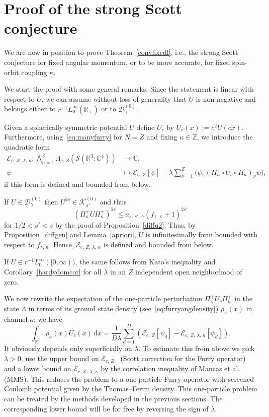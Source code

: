 \documentclass[AHL,Unicode,longabstracts,published]{cedram}
\newcommand*\dx{\mathrm{d}x}
\newcommand*\cz{\mathbb{C}}
\newcommand*\gz{\mathbb{Z}}
\newcommand*\rz{\mathbb{R}}
\newcommand*\zp{\dot{\gz}}
\newcommand*\cD{\mathcal{D}}
\newcommand*\cE{\mathcal{E}}
\newcommand*\cK{\mathcal{K}}
\newcommand*\cS{\mathcal{S}}
\begin{document}
\section{Proof of the strong Scott conjecture}
We are now in position to prove Theorem~\ref{convfixedl}, i.e., the strong Scott conjecture for fixed angular momentum, or to be more accurate, for fixed spin-orbit coupling $\kappa$.

We start the proof with some general remarks. Since the statement is linear with respect to $U$, we can assume without loss of generality that $U$ is non-negative and belongs either to $r^{-1}L^\infty_0 (\rz_+)$ or to $\cD_\gamma^{(0)}$.

Given a spherically symmetric potential $U$ define $U_c$ by $U_c(x):=c^2U(cx)$. Furthermore, using~\eqref{eq:manyfurry} for $N=Z$ and fixing $\kappa\in\zp$, we introduce the quadratic form
\begin{equation}
\begin{split}
\cE_{c,\,Z,\,\lambda,\,\kappa}:\bigwedge_{n=1}^Z\Lambda_{c,\,Z}\left(\cS\left(\rz^3:\cz^4\right)\right) &\rightarrow\cz,\\
\psi &\mapsto \cE_{c,\,Z}[\psi]-\lambda \sum_{\nu=1}^Z\big(\psi,\left(\Pi_\kappa\circ U_c\circ\Pi_\kappa\right)_\nu\psi\big),
\end{split}
\end{equation}
if this form is defined and bounded from below.

If $U\in\cD_\gamma^{(0)}$ then $U^{2s}\in\cK_{s'}^{(0)}$ and thus
\[
\left(\Pi^+_{\kappa}U\Pi_{\kappa}^+\right)^{2s} \leq a_{s,\,s',\,\gamma}\left(f_{\gamma,\,\kappa}+1\right)^{2s'}
\]
for $1/2<s'<s$ by the proof of Proposition~\ref{diffu2}. Thus, by Proposition~\ref{diffgen} and Lemma~\ref{apriori}, $U$ is infinitesimally form bounded with respect to $f_{\gamma,\,\kappa}$. Hence, $\cE_{c,\,Z,\,\lambda,\,\kappa}$ is defined and bounded from below.

If $U\in r^{-1}L^\infty_0 ([0,\infty))$, the same follows from Kato's inequality and Corollary~\ref{hardydomcor} for all $\lambda$ in an $Z$ independent open neighborhood of zero.

We now rewrite the expectation of the one-particle perturbation $\Pi^+_\kappa U_c\Pi^+_\kappa$ in the state $\Lambda$ in terms of its ground state density (see~\eqref{eq:furryangdensity}) $\rho_{\kappa}(x)$ in channel $\kappa$; we have
\begin{equation}\label{eq:4.2}
\int_{\rz^3} \rho_\kappa(x)U_c(x)\,\dx = \frac{1}{D\lambda}\sum_{d=1}^D\left(\cE_{c,\,Z}[\psi_d]-\cE_{c,\,Z,\,\lambda,\,\kappa}[\psi_d]\right).
\end{equation}
It obviously depends only superficially on $\lambda$. To estimate this from above we pick $\lambda>0$, use the upper bound on $\cE_{c,\,Z}$~\cite{HandrekSiedentop2015} (Scott correction for the Furry operator) and a lower bound on $\cE_{c,\,Z,\,\lambda,\,\kappa}$ by the correlation inequality of Mancas et al.~\cite{Mancasetal2004} (MMS). This reduces the problem to a one-particle Furry operator with screened Coulomb potential given by the Thomas--Fermi density. This one-particle problem can be treated by the methods developed in the previous sections. The corresponding lower bound will be for free by reversing the sign of $\lambda$.
\end{document}
